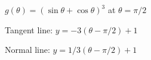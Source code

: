{$g(\theta) = (\sin\theta+\cos\theta)^3$ at $\theta = \pi/2$
}
{Tangent line: $y=-3(\theta - \pi/2)+1$

Normal line: $y=1/3(\theta - \pi/2)+1$
}
